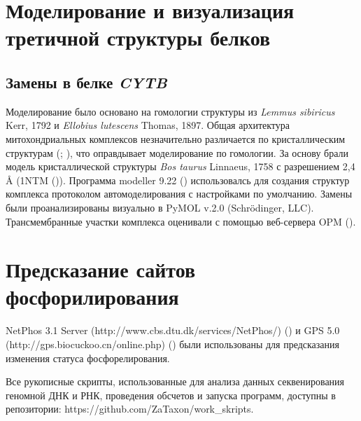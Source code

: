 \section{Моделирование и визуализация третичной структуры белков}

\subsection{Замены в белке \textit{CYTB}}
Моделирование было основано на гомологии структуры из \textit{Lemmus sibiricus} Kerr, 1792 и \textit{Ellobius lutescens} Thomas, 1897. Общая архитектура митохондриальных комплексов незначительно различается по кристаллическим структурам (\cite{Crowley2008}; \cite{Hunte2000}), что оправдывает моделирование по гомологии. За основу брали модель кристаллической структуры  \textit{Bos taurus} Linnaeus, 1758 с разрешением 2,4 Å (1NTM (\cite{Gao2003})). Программа modeller 9.22 (\cite{Webb2016}) использовалсь для создания структур комплекса протоколом автомоделирования с настройками по умолчанию. Замены были проанализированы визуально в PyMOL v.2.0 (Schrödinger, LLC). Трансмембранные участки комплекса оценивали с помощью веб-сервера OPM (\cite{Lomize2012}).



\section{Предсказание сайтов фосфорилирования}

NetPhos 3.1 Server (http://www.cbs.dtu.dk/services/NetPhos/) (\cite{Blom2004}) и GPS 5.0 (http://gps.biocuckoo.cn/online.php) (\cite{Xue2011}) были использованы для предсказания изменения статуса фосфорелирования.


Все рукописные скрипты, использованные для анализа данных секвенирования геномной ДНК и РНК, проведения обсчетов и запуска программ, доступны в репозитории:  https://github.com/ZaTaxon/work\_skripts.